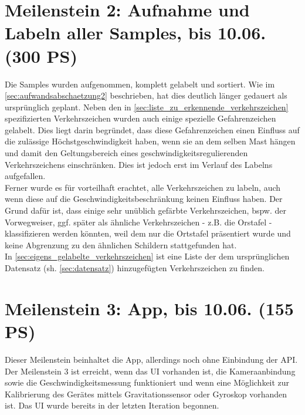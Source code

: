 \documentclass[12pt,a4paper,ngerman,enabledeprecatedfontcommands]{scrreprt}
\begin{document}
\section[Meilenstein 2: Aufnahme und Labeln aller Samples]{Meilenstein 2: Aufnahme und Labeln aller Samples, bis 10.06. (300 PS)}

Die Samples wurden aufgenommen, komplett gelabelt und sortiert. Wie im \cref{sec:aufwandsabschaetzung2} beschrieben, hat dies deutlich länger gedauert als ursprünglich geplant. Neben den in \cref{sec:liste_zu_erkennende_verkehrszeichen} spezifizierten Verkehrszeichen wurden auch einige spezielle Gefahrenzeichen gelabelt. Dies liegt darin begründet, dass diese Gefahrenzeichen einen Einfluss auf die zulässige Höchstgeschwindigkeit haben, wenn sie an dem selben Mast hängen und damit den Geltungsbereich  eines geschwindigkeitsregulierenden Verkehrszeichens einschränken. Dies ist jedoch erst im Verlauf des Labelns aufgefallen.\\

Ferner wurde es für vorteilhaft erachtet, alle Verkehrszeichen zu labeln, auch wenn diese auf die Geschwindigkeitsbeschränkung keinen Einfluss haben. Der Grund dafür ist, dass einige sehr unüblich gefärbte Verkehrszeichen, bspw. der Vorwegweiser, ggf. später als ähnliche Verkehrszeichen - z.B. die Orstafel  - klassifizieren werden könnten, weil dem  nur die Ortstafel präsentiert wurde und keine Abgrenzung zu den ähnlichen Schildern stattgefunden hat.\\
In \cref{sec:eigens_gelabelte_verkehrszeichen} ist eine Liste der dem ursprünglichen Datensatz (sh. \cref{sec:datensatz}) hinzugefügten Verkehrszeichen zu finden.\\
 
\section[Meilenstein 3: App]{Meilenstein 3: App, bis 10.06. (155 PS)}
Dieser Meilenstein beinhaltet die \gls{App}, allerdings noch ohne Einbindung der \gls{API}. Der Meilenstein 3 ist erreicht, wenn das \gls{UI} vorhanden ist, die Kameraanbindung sowie die Geschwindigkeitsmessung funktioniert und wenn eine Möglichkeit zur Kalibrierung des Gerätes mittels Gravitationssensor oder Gyroskop vorhanden ist. Das \gls{UI} wurde bereits in der letzten Iteration begonnen.\\
\end{document}
